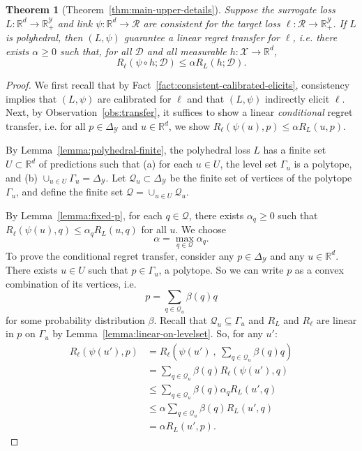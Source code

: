 \documentclass{article}
\newtheorem*{theorem*}{Theorem}
\theoremstyle{definition}\newtheorem{definition}{Definition}
\theoremstyle{definition}\newtheorem{assumption}{Assumption}
\newcommand{\reals}{\mathbb{R}}
\newcommand{\simplex}{\Delta_\Y}
\newcommand{\D}{\mathcal{D}}
\newcommand{\R}{\mathcal{R}}
\newcommand{\X}{\mathcal{X}}
\newcommand{\Y}{\mathcal{Y}}
\begin{document}
\begin{theorem*}[Theorem~\ref{thm:main-upper-details}]
  Suppose the surrogate loss $L: \reals^d \to \reals_+^{\Y}$ and link $\psi: \reals^d \to \R$ are consistent for the target loss $\ell: \R \to \reals_+^{\Y}$.
  If $L$ is polyhedral, then $(L,\psi)$ guarantee a linear regret transfer for $\ell$, i.e. there exists $\alpha \geq 0$ such that, for all $\D$ and all measurable $h: \X \to \reals^d$,
    \[ R_{\ell}(\psi \circ h ; \D) \leq \alpha R_L(h ; \D) . \]
\end{theorem*}
\begin{proof}
  We first recall that by Fact~\ref{fact:consistent-calibrated-elicits}, consistency implies that $(L,\psi)$ are calibrated for $\ell$ and that $(L,\psi)$ indirectly elicit $\ell$.
  Next, by Observation~\ref{obs:transfer}, it suffices to show a linear \emph{conditional} regret transfer, i.e. for all $p \in \simplex$ and $u \in \reals^d$, we show $R_{\ell}(\psi(u),p) \leq \alpha R_L(u,p)$.
  
  By Lemma~\ref{lemma:polyhedral-finite}, the polyhedral loss $L$ has a finite set $U \subset \reals^d$ of predictions such that (a) for each $u \in U$, the level set $\Gamma_u$ is a polytope, and (b) $\cup_{u \in U} \Gamma_u = \simplex$.
  Let $\mathcal{Q}_u \subset \simplex$ be the finite set of vertices of the polytope $\Gamma_u$, and define the finite set $\mathcal{Q} = \cup_{u \in U} \mathcal{Q}_u$.
  
  By Lemma~\ref{lemma:fixed-p}, for each $q \in \mathcal{Q}$, there exists $\alpha_q \geq 0$ such that $R_{\ell}(\psi(u),q) \leq \alpha_q R_L(u,q)$ for all $u$.
  We choose
    \[ \alpha = \max_{q \in \mathcal{Q}} \alpha_q . \]
  To prove the conditional regret transfer, consider any $p \in \simplex$ and any $u \in \reals^d$.
  There exists $u \in U$ such that $p \in \Gamma_u$, a polytope.
  So we can write $p$ as a convex combination of its vertices, i.e.
    \[ p = \sum_{q \in \mathcal{Q}_u} \beta(q) q \]
  for some probability distribution $\beta$.
  Recall that $\mathcal{Q}_u \subseteq \Gamma_u$ and $R_L$ and $R_{\ell}$ are linear in $p$ on $\Gamma_u$ by Lemma~\ref{lemma:linear-on-levelset}.
  So, for any $u'$:
  \begin{align*}
    R_{\ell}(\psi(u'),p)
    &=    R_{\ell}\left(\psi(u') ~,~ \sum_{q \in \mathcal{Q}_u} \beta(q) q\right)  \\
    &=    \sum_{q \in \mathcal{Q}_u} \beta(q) R_{\ell}(\psi(u'),q)  \\
    &\leq \sum_{q \in \mathcal{Q}_u} \beta(q) \alpha_{q} R_L(u',q)  \\
    &\leq \alpha \sum_{q \in \mathcal{Q}_u} \beta(q) R_L(u',q)  \\
    &=    \alpha R_L(u', p) .
  \end{align*}
\end{proof}
\end{document}
